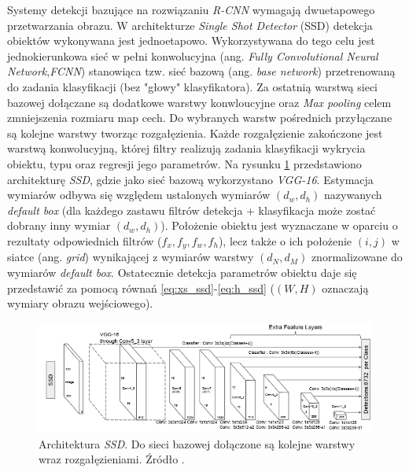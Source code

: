 Systemy detekcji bazujące na rozwiązaniu \emph{R-CNN} wymagają dwuetapowego przetwarzania obrazu.
W architekturze \emph{Single Shot Detector} (SSD) \cite{ssd} detekcja obiektów wykonywana jest jednoetapowo. 
Wykorzystywana do tego celu jest jednokierunkowa sieć w pełni konwolucyjna (ang. \emph{Fully Convolutional Neural Network},\emph{FCNN}) stanowiąca tzw. sieć bazową (ang. \emph{base network}) przetrenowaną do zadania klasyfikacji (bez "głowy" klasyfikatora).
Za ostatnią warstwą sieci bazowej dołączane są dodatkowe warstwy konwloucyjne oraz \emph{Max pooling} celem zmniejszenia rozmiaru map cech.
Do wybranych warstw pośrednich przyłączane są kolejne warstwy tworząc rozgałęzienia.
Każde rozgałęzienie zakończone jest warstwą konwolucyjną, której filtry realizują zadania klasyfikacji wykrycia obiektu, typu oraz regresji jego parametrów. 
Na rysunku \ref{fig:ssd_arch} przedstawiono architekturę \emph{SSD}, gdzie jako sieć bazową wykorzystano \emph{VGG-16}. 
Estymacja wymiarów odbywa się względem ustalonych wymiarów $(d_w, d_h)$ nazywanych \emph{default box} (dla każdego zastawu filtrów detekcja + klasyfikacja może zostać dobrany inny wymiar $(d_w, d_h)$).
Położenie obiektu jest wyznaczane w oparciu o rezultaty odpowiednich filtrów ($f_x, f_y, f_w, f_h$), lecz także o ich położenie $(i,j)$ w siatce (ang. \emph{grid}) wynikającej z wymiarów warstwy $(d_N, d_M)$ znormalizowane do wymiarów \emph{default box}.
Ostatecznie detekcja parametrów obiektu daje się przedstawić za pomocą równań \eqref{eq:xs_ssd}-\eqref{eq:h_ssd} ($(W, H)$ oznaczają wymiary obrazu wejściowego). 
\begin{figure}
    \centering
    \includegraphics[width=0.9\linewidth]{images/ssd_img.png}
    \caption{Architektura \emph{SSD}. Do sieci bazowej dołączone są kolejne warstwy wraz rozgałęzieniami.
    Źródło \cite{ssd}.}
    \label{fig:ssd_arch}
\end{figure}
